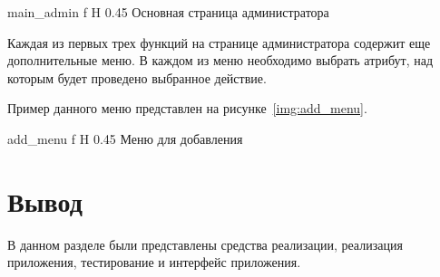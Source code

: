 
{main_admin} %
{f} %
{H} %
{0.45\textwidth} %
{Основная страница администратора} %

Каждая из первых трех функций на странице администратора содержит еще дополнительные меню.
В каждом из меню необходимо выбрать атрибут, над которым будет проведено выбранное действие.

Пример данного меню представлен на рисунке~\ref{img:add_menu}.


{add_menu} %
{f} %
{H} %
{0.45\textwidth} %
{Меню для добавления} %


\section*{Вывод}
В данном разделе были представлены средства реализации, реализация приложения, тестирование и интерфейс приложения.
